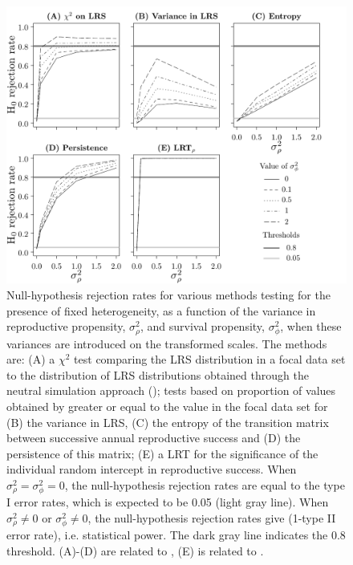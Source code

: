 \begin{figure}[ht]
	\includegraphics[width=\textwidth]{FiguresDynHet/Figure2}
		\caption{ \footnotesize Null-hypothesis rejection rates for various methods testing for the presence of fixed heterogeneity, as a function of the variance in reproductive propensity, $\sigma_{\rho}^2$, and survival propensity, $\sigma_{\phi}^2$, when these variances are introduced on the transformed scales. The methods are: (A) a $\chi^2$ test comparing the LRS distribution in a focal data set to the distribution of LRS distributions obtained through the neutral simulation approach (\NSM); tests based on proportion of values obtained by \NSM greater or equal to the value in the focal data set for (B) the variance in LRS, (C) the entropy of the transition matrix between successive annual reproductive success and (D) the persistence of this matrix; (E) a LRT for the significance of the individual random intercept in reproductive success. When $\sigma_{\rho}^2 = \sigma_{\phi}^2 = 0$, the null-hypothesis rejection rates are equal to the type I error rates, which is expected to be 0.05 (light gray line). When $\sigma_{\rho}^2 \neq 0$ or $\sigma_{\phi}^2 \neq 0$, the null-hypothesis rejection rates give (1-type II error rate), i.e. statistical power. The dark gray line indicates the 0.8 threshold. (A)-(D) are related to \NSM, (E) is related to \MM.}
	\label{figure:VarIn}
\end{figure} 	

